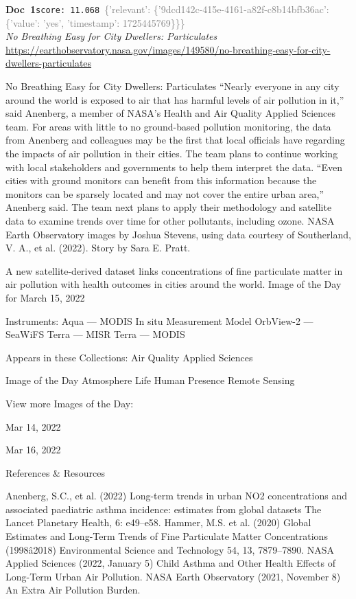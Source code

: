 \documentclass[a4paper,11pt]{article}
\begin{document}
\begin{docenv}
{\footnotesize\textcolor{doccolor}{\textbf{Doc~1}}}\hfill{\tiny\texttt{score:~11.068}}\ {\tiny\textcolor{gray}{\{'relevant': \{'9dcd142c-415e-4161-a82f-c8b14bfb36ac': \{'value': 'yes', 'timestamp': 1725445769\}\}\}}}\\[3pt]
{\small\textit{No Breathing Easy for City Dwellers: Particulates}}\\[2pt]
{\tiny\url{https://earthobservatory.nasa.gov/images/149580/no-breathing-easy-for-city-dwellers-particulates}}\\[4pt]
{\footnotesize No Breathing Easy for City Dwellers: Particulates
“Nearly everyone in any city around the world is exposed to air that has harmful levels of air pollution in it,” said Anenberg, a member of NASA’s Health and Air Quality Applied Sciences team.
For areas with little to no ground-based pollution monitoring, the data from Anenberg and colleagues may be the first that local officials have regarding the impacts of air pollution in their cities. The team plans to continue working with local stakeholders and governments to help them interpret the data.
“Even cities with ground monitors can benefit from this information because the monitors can be sparsely located and may not cover the entire urban area,” Anenberg said. The team next plans to apply their methodology and satellite data to examine trends over time for other pollutants, including ozone.
NASA Earth Observatory images by Joshua Stevens, using data courtesy of Southerland, V. A., et al. (2022). Story by Sara E. Pratt.

A new satellite-derived dataset links concentrations of fine particulate matter in air pollution with health outcomes in cities around the world.
Image of the Day for March 15, 2022

Instruments:
Aqua — MODIS
In situ Measurement
Model
OrbView-2 — SeaWiFS
Terra — MISR
Terra — MODIS

Appears in these Collections:
Air Quality
Applied Sciences

Image of the Day
Atmosphere
Life
Human Presence
Remote Sensing

View more Images of the Day:

Mar 14, 2022

Mar 16, 2022

References \& Resources

Anenberg, S.C., et al. (2022) Long-term trends in urban NO2 concentrations and associated paediatric asthma incidence: estimates from global datasets The Lancet Planetary Health, 6: e49–e58.
Hammer, M.S. et al. (2020) Global Estimates and Long-Term Trends of Fine Particulate Matter Concentrations (1998â2018) Environmental Science and Technology 54, 13, 7879–7890.
NASA Applied Sciences (2022, January 5) Child Asthma and Other Health Effects of Long-Term Urban Air Pollution. 
NASA Earth Observatory (2021, November 8) An Extra Air Pollution Burden.}
\end{docenv}
\end{document}

